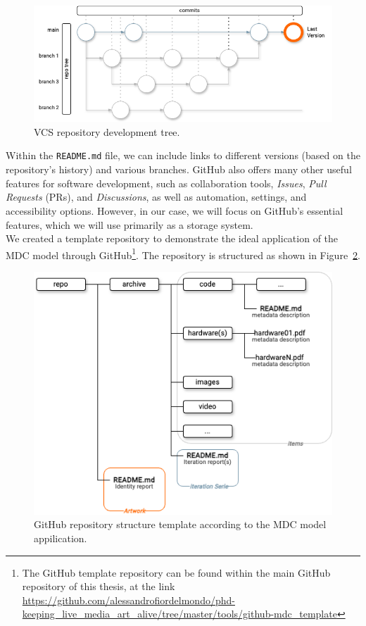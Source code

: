 \begin{figure}[!h]
    \centering
    \includegraphics[width=1\linewidth]{chapters/4-MDC_model_application/image/graph04-githubtree.png}
    \caption{VCS repository development tree.}
    \label{fig:c4-github-tree}
\end{figure}

Within the \texttt{README.md} file, we can include links to different versions (based on the repository’s history) and various branches. GitHub also offers many other useful features for software development, such as collaboration tools, \textit{Issues}, \textit{Pull Requests} (PRs), and \textit{Discussions}, as well as automation, settings, and accessibility options. However, in our case, we will focus on GitHub’s essential features, which we will use primarily as a storage system.\\
We created a template repository to demonstrate the ideal application of the MDC model through GitHub\footnote{The GitHub template repository can be found within the main GitHub repository of this thesis, at the link \url{https://github.com/alessandrofiordelmondo/phd-keeping_live_media_art_alive/tree/master/tools/github-mdc_template}}. The repository is structured as shown in Figure~\ref{fig:c4-github-template}.

\begin{figure}[!h]
    \centering
    \includegraphics[width=\linewidth]{chapters/4-MDC_model_application/image/graph04-githubtemplate.png}
    \caption{GitHub repository structure template according to the MDC model appilication.}
    \label{fig:c4-github-template}
\end{figure}

